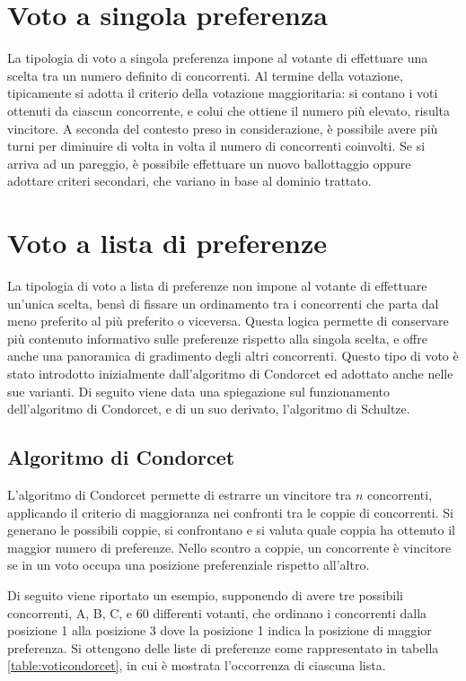 \documentclass[12pt,a4paper,openright,twoside]{book}
\begin{document}
\section{Voto a singola preferenza}
La tipologia di voto a singola preferenza impone al votante di effettuare una scelta tra un
numero definito di concorrenti. Al termine della votazione, tipicamente si adotta il criterio
della votazione maggioritaria: si contano i voti ottenuti da ciascun concorrente, e colui che ottiene il
numero più elevato, risulta vincitore. A seconda del contesto preso in considerazione,
è possibile avere più turni per diminuire di volta in volta il numero di concorrenti coinvolti.
Se si arriva ad un pareggio, è possibile effettuare un nuovo ballottaggio oppure adottare
criteri secondari, che variano in base al dominio trattato.
\section{Voto a lista di preferenze}
La tipologia di voto a lista di preferenze non impone al votante di effettuare un'unica scelta,
bensì di fissare un ordinamento tra i concorrenti che parta dal meno preferito al più preferito
o viceversa. Questa logica permette di conservare più contenuto informativo sulle preferenze
rispetto alla singola scelta, e offre anche una panoramica di gradimento degli altri concorrenti.
Questo tipo di voto è stato introdotto inizialmente dall'algoritmo di Condorcet ed adottato
anche nelle sue varianti. Di seguito viene data una spiegazione sul funzionamento dell'algoritmo
di Condorcet, e di un suo derivato, l'algoritmo di Schultze.
\subsection{Algoritmo di Condorcet}
L'algoritmo di Condorcet permette di estrarre un vincitore tra ${n}$ concorrenti,
applicando il criterio di maggioranza nei confronti tra le coppie di concorrenti.
Si generano le possibili coppie, si confrontano e si valuta quale coppia ha ottenuto il
maggior numero di preferenze. Nello scontro a coppie, un concorrente è vincitore se in un
voto occupa una posizione preferenziale rispetto all'altro.

Di seguito viene riportato un esempio, supponendo di avere tre possibili concorrenti, A, B, C,
e 60 differenti votanti, che ordinano i concorrenti dalla posizione 1 alla posizione 3 dove la posizione 1 
indica la posizione di maggior preferenza.
Si ottengono delle liste di preferenze come rappresentato in tabella \ref{table:voticondorcet}, in cui
è mostrata l'occorrenza di ciascuna lista.
\end{document}
